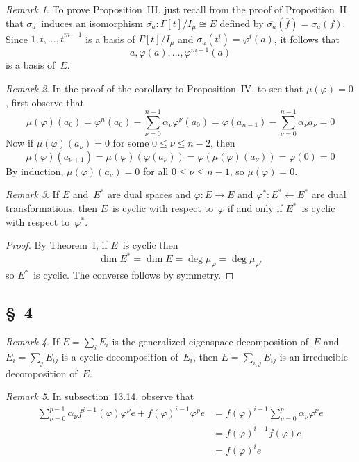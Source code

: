 \documentclass[letterpaper,12pt]{article}
\newcommand{\from}{\leftarrow}
\newcommand{\iso}{\cong}
\newcommand{\proj}[1]{\overline{#1}}
\theoremstyle{definition}
\theoremstyle{remark}
\newtheorem*{rmk}{Remark}
\begin{document}
\begin{rmk}
To prove Proposition~III, just recall from the proof of Proposition~II that \(\sigma_a\)~induces an isomorphism \(\proj{\sigma_a}:\Gamma[t]/I_{\mu}\iso E\) defined by \(\proj{\sigma_a}(\proj{f})=\sigma_a(f)\). Since \(1,\proj{t},\ldots,\proj{t}^{m-1}\) is a basis of \(\Gamma[t]/I_{\mu}\) and \(\sigma_a(t^i)=\varphi^i(a)\), it follows that
\[a,\varphi(a),\ldots,\varphi^{m-1}(a)\]
is a basis of~\(E\).
\end{rmk}

\begin{rmk}
In the proof of the corollary to Proposition~IV, to see that \(\mu(\varphi)=0\), first observe that
\[\mu(\varphi)(a_0)=\varphi^n(a_0)-\sum_{\nu=0}^{n-1}\alpha_{\nu}\varphi^{\nu}(a_0)=\varphi(a_{n-1})-\sum_{\nu=0}^{n-1}\alpha_{\nu}a_{\nu}=0\]
Now if \(\mu(\varphi)(a_{\nu})=0\) for some \(0\le\nu\le n-2\), then
\[\mu(\varphi)(a_{\nu+1})=\mu(\varphi)(\varphi(a_{\nu}))=\varphi(\mu(\varphi)(a_{\nu}))=\varphi(0)=0\]
By induction, \(\mu(\varphi)(a_{\nu})=0\) for all \(0\le\nu\le n-1\), so \(\mu(\varphi)=0\).
\end{rmk}

\begin{rmk}
If \(E\) and~\(E^*\) are dual spaces and \(\varphi:E\to E\) and \(\varphi^*:E^*\from E^*\) are dual transformations, then \(E\)~is cyclic with respect to~\(\varphi\) if and only if \(E^*\)~is cyclic with respect to~\(\varphi^*\).
\end{rmk}
\begin{proof}
By Theorem~I, if \(E\)~is cyclic then
\[\dim E^*=\dim E=\deg\mu_{\varphi}=\deg\mu_{\varphi^*}\]
so \(E^*\)~is cyclic. The converse follows by symmetry.
\end{proof}

\subsection*{\S~4}
\begin{rmk}
If \(E=\sum_i E_i\) is the generalized eigenspace decomposition of~\(E\) and \(E_i=\sum_j E_{ij}\) is a cyclic decomposition of~\(E_i\), then \(E=\sum_{i,j}E_{ij}\) is an irreducible decomposition of~\(E\).
\end{rmk}

\begin{rmk}
In subsection~13.14, observe that
\begin{align*}
\sum_{\nu=0}^{p-1}\alpha_{\nu}f^{i-1}(\varphi)\varphi^{\nu}e+f(\varphi)^{i-1}\varphi^pe&=f(\varphi)^{i-1}\sum_{\nu=0}^p\alpha_{\nu}\varphi^{\nu}e\\
	&=f(\varphi)^{i-1}f(\varphi)e\\
	&=f(\varphi)^ie
\end{align*}
\end{rmk}
\end{document}
